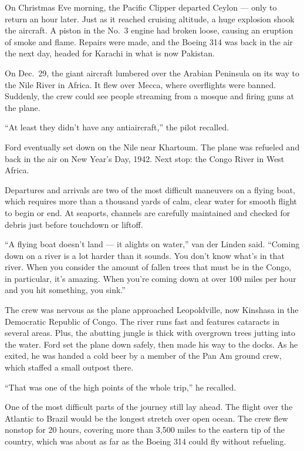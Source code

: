 \documentclass[12pt]{article}
\begin{document}
On Christmas Eve morning, the Pacific Clipper departed Ceylon --- only to return an hour later. Just as it reached cruising altitude, a huge explosion shook the aircraft. A piston in the No.~3 engine had broken loose, causing an eruption of smoke and flame. Repairs were made, and the Boeing 314 was back in the air the next day, headed for Karachi in what is now Pakistan.

On Dec.~29, the giant aircraft lumbered over the Arabian Peninsula on its way to the Nile River in Africa. It flew over Mecca, where overflights were banned. Suddenly, the crew could see people streaming from a mosque and firing guns at the plane.

``At least they didn’t have any antiaircraft,'' the pilot recalled.

Ford eventually set down on the Nile near Khartoum. The plane was refueled and back in the air on New Year’s Day, 1942. Next stop: the Congo River in West Africa.

Departures and arrivals are two of the most difficult maneuvers on a flying boat, which requires more than a thousand yards of calm, clear water for smooth flight to begin or end. At seaports, channels are carefully maintained and checked for debris just before touchdown or liftoff.

``A flying boat doesn’t land --- it alights on water,'' van der Linden said. ``Coming down on a river is a lot harder than it sounds. You don’t know what’s in that river. When you consider the amount of fallen trees that must be in the Congo, in particular, it’s amazing. When you’re coming down at over 100 miles per hour and you hit something, you sink.''

The crew was nervous as the plane approached Leopoldville, now Kinshasa in the Democratic Republic of Congo. The river runs fast and features cataracts in several areas. Plus, the abutting jungle is thick with overgrown trees jutting into the water. Ford set the plane down safely, then made his way to the docks. As he exited, he was handed a cold beer by a member of the Pan Am ground crew, which staffed a small outpost there.

``That was one of the high points of the whole trip,'' he recalled.

One of the most difficult parts of the journey still lay ahead. The flight over the Atlantic to Brazil would be the longest stretch over open ocean. The crew flew nonstop for 20 hours, covering more than 3,500 miles to the eastern tip of the country, which was about as far as the Boeing 314 could fly without refueling.
\end{document}
